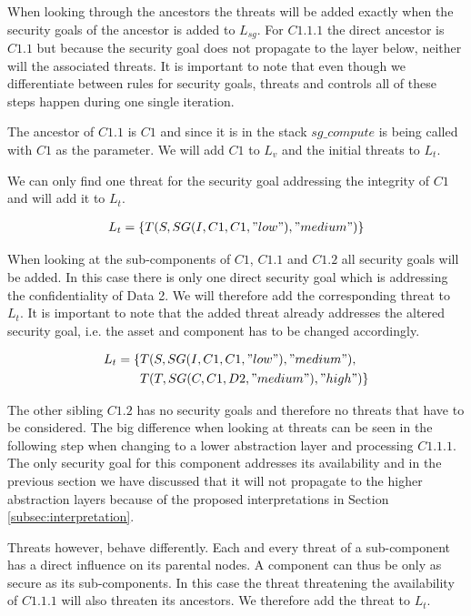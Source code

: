 When looking through the ancestors the threats will be added exactly when the security goals of the ancestor is added to $L_{sg}$. For $C1.1.1$ the direct ancestor is $C1.1$ but because the security goal does not propagate to the layer below, neither will the associated threats. It is important to note that even though we differentiate between rules for security goals, threats and controls all of these steps happen during one single iteration.

The ancestor of $C1.1$ is $C1$ and since it is in the stack $sg\_compute$ is being called with $C1$ as the parameter. We will add $C1$ to $L_v$ and the initial threats to $L_t$.

We can only find one threat for the security goal addressing the integrity of $C1$ and will add it to $L_t$.

\begin{align*}
L_t = \{T(S, SG(I,C1,C1,"low"), "medium")\}
\end{align*}

When looking at the sub-components of $C1$, $C1.1$ and $C1.2$ all security goals will be added. In this case there is only one direct security goal which is addressing the confidentiality of Data 2. We will therefore add the corresponding threat to $L_t$. It is important to note that the added threat already addresses the altered security goal, i.e. the asset and component has to be changed accordingly.

\begin{align*}
L_t = \{&T(S, SG(I,C1,C1,"low"), "medium"), \\
&T(T, SG(C,C1,D2,"medium"), "high")
\}
\end{align*}

The other sibling $C1.2$ has no security goals and therefore no threats that have to be considered. The big difference when looking at threats can be seen in the following step when changing to a lower abstraction layer and processing $C1.1.1$. The only security goal for this component addresses its availability and in the previous section we have discussed that it will not propagate to the higher abstraction layers because of the proposed interpretations in Section \ref{subsec:interpretation}. 

Threats however, behave differently. Each and every threat of a sub-component has a direct influence on its parental nodes. A component can thus be only as secure as its sub-components. In this case the threat threatening the availability of $C1.1.1$ will also threaten its ancestors. We therefore add the threat to $L_t$.

